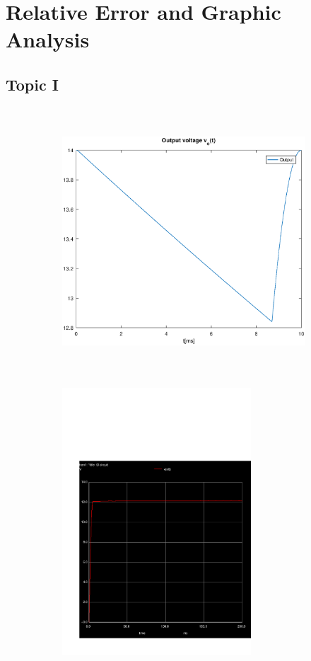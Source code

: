 \section{Relative Error and Graphic Analysis}
\label{sec:erroranalysis}


\subsection{Topic I}
\label{subsec:first_topic_error}

\begin{figure}[H]

\begin{subfigure}{0.5\textwidth}
\includegraphics[width=0.9\linewidth, height=10cm]{envelope.eps} 
\label{fig:theofirstcompare}
\end{subfigure}
\begin{subfigure}{0.5\textwidth}
\includegraphics[width=0.9\linewidth, height=10cm]{trans1.pdf}
\label{fig:simfirstcompare}
\end{subfigure}

\label{fig:compar1}
\end{figure}

